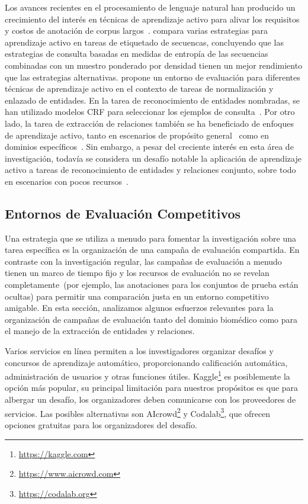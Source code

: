 Los avances recientes en el procesamiento de lenguaje natural han producido un crecimiento del interés en técnicas de aprendizaje activo para alivar los requisitos y costos de anotación de corpus largos~\cite{Olsson2009ALS, Tchoua2019ActiveLY}.
\citet{settles2008analysis} compara varias estrategias para aprendizaje activo en tareas de etiquetado de secuencas, concluyendo que las estrategias de consulta basadas en medidas de entropía de las secuencias combinadas con un muestro ponderado por densidad tienen un mejor rendimiento que las estrategias alternativas.
\citet{Meduri2020ACB} propone un entorno de evaluación para diferentes técnicas de aprendizaje activo en el contexto de tareas de normalización y enlazado de entidades.
En la tarea de reconocimiento de entidades nombradas, se han utilizado modelos CRF para seleccionar los ejemplos de consulta~\citep{Claveau2017StrategiesTS, Lin2019AlpacaTagAA}.
Por otro lado, la tarea de extracción de relaciones también se ha beneficiado de enfoques de aprendizaje activo, tanto en escenarios de propósito general~\cite{fu2013efficient} como en dominios específicos~\cite{zhang2012unified}.
Sin embargo, a pesar del creciente interés en esta área de investigación, todavía se considera un desafío notable la aplicación de aprendizaje activo a tareas de reconocimiento de entidades y relaciones conjunto, sobre todo en escenarios con pocos recursos~\cite{Gao2019ActiveER}.

\subsection{Entornos de Evaluación Competitivos}

Una estrategia que se utiliza a menudo para fomentar la investigación sobre una tarea específica es la organización de una campaña de evaluación compartida.
En contraste con la investigación regular, las campañas de evaluación a menudo tienen un marco de tiempo fijo y los recursos de evaluación no se revelan completamente~(por ejemplo, las anotaciones para los conjuntos de prueba están ocultas) para permitir una comparación justa en un entorno competitivo amigable.
En esta sección, analizamos algunos esfuerzos relevantes para la organización de campañas de evaluación tanto del dominio biomédico como para el manejo de la extracción de entidades y relaciones.

Varios servicios en línea permiten a los investigadores organizar desafíos y concursos de aprendizaje automático, proporcionando calificación automática, administración de usuarios y otras funciones útiles.
Kaggle\footnote{\url {https://kaggle.com}} es posiblemente la opción más popular, su principal limitación para nuestros propósitos es que para albergar un desafío, los organizadores deben comunicarse con los proveedores de servicios.
Las posibles alternativas son AIcrowd\footnote{\url{https://www.aicrowd.com}} y Codalab\footnote{\url{https://codalab.org}}, que ofrecen opciones gratuitas para los organizadores del desafío.

